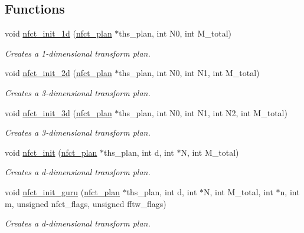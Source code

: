 \subsection*{Functions}
\begin{CompactItemize}
\item 
void \hyperlink{group__nfsct_gcdaa71ef0c4ea05c55a09a08845b3043}{nfct\_\-init\_\-1d} (\hyperlink{structnfct__plan}{nfct\_\-plan} $\ast$ths\_\-plan, int N0, int M\_\-total)
\begin{CompactList}\small\item\em Creates a 1-dimensional transform plan. \item\end{CompactList}\item 
void \hyperlink{group__nfsct_g84c8a611ea11546b90a7db424ebced7c}{nfct\_\-init\_\-2d} (\hyperlink{structnfct__plan}{nfct\_\-plan} $\ast$ths\_\-plan, int N0, int N1, int M\_\-total)
\begin{CompactList}\small\item\em Creates a 3-dimensional transform plan. \item\end{CompactList}\item 
void \hyperlink{group__nfsct_g7894f72320bda7850ccf43b9a227fe09}{nfct\_\-init\_\-3d} (\hyperlink{structnfct__plan}{nfct\_\-plan} $\ast$ths\_\-plan, int N0, int N1, int N2, int M\_\-total)
\begin{CompactList}\small\item\em Creates a 3-dimensional transform plan. \item\end{CompactList}\item 
void \hyperlink{group__nfsct_g69ac40972c84cfd04909723da056004b}{nfct\_\-init} (\hyperlink{structnfct__plan}{nfct\_\-plan} $\ast$ths\_\-plan, int d, int $\ast$N, int M\_\-total)
\begin{CompactList}\small\item\em Creates a d-dimensional transform plan. \item\end{CompactList}\item 
void \hyperlink{group__nfsct_ga2f86c85130172f1151a85996ea1bfa3}{nfct\_\-init\_\-guru} (\hyperlink{structnfct__plan}{nfct\_\-plan} $\ast$ths\_\-plan, int d, int $\ast$N, int M\_\-total, int $\ast$n, int m, unsigned nfct\_\-flags, unsigned fftw\_\-flags)
\begin{CompactList}\small\item\em Creates a d-dimensional transform plan. \item\end{CompactList}\item 

\end{CompactItemize}
